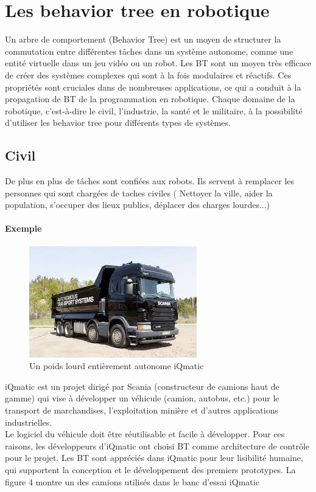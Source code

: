 \documentclass[titlepage]{article}
\begin{document}
	\section{Les behavior tree en robotique}
			Un arbre de comportement (Behavior Tree) est un moyen de structurer la commutation entre différentes tâches dans un système autonome, comme une entité virtuelle dans un jeu vidéo ou un robot. Les BT sont un moyen très efficace de créer des systèmes complexes qui sont à la fois modulaires et réactifs. Ces propriétés sont cruciales dans de nombreuses applications, ce qui a conduit à la propagation de BT de la programmation en robotique. Chaque domaine de la robotique, c'est-à-dire le civil, l'industrie, la santé et le militaire, à la possibilité d'utiliser les behavior tree pour différents types de systèmes.  
		\subsection{Civil}
		De plus en plus de tâches sont confiées aux robots. Ils servent à remplacer les personnes qui sont chargées de taches civiles ( Nettoyer la ville, aider la population, s'occuper des lieux publics, déplacer des charges lourdes...)
		\paragraph{Exemple}
		\begin{figure}[h!]
			\includegraphics[width=\linewidth]{img/vehicul.jpg}
			\caption{Un poids lourd entièrement autonome iQmatic}
			\label{fig:civil}
		\end{figure}	
		iQmatic \cite{kth} est un projet dirigé par Scania (constructeur de camions haut de gamme) qui vise à développer un véhicule (camion, autobus, etc.) pour le transport de marchandises, l’exploitation minière et d’autres applications industrielles. 
		\\
		Le logiciel du véhicule doit être réutilisable et facile à développer. Pour ces raisons, les développeurs d’iQmatic ont choisi BT comme architecture de contrôle pour le projet.
		Les BT sont appréciés dans iQmatic pour leur lisibilité humaine, qui supportent la conception et le développement des premiers prototypes. La figure 4 montre un des camions utilisés dans le banc d’essai iQmatic
\end{document}
